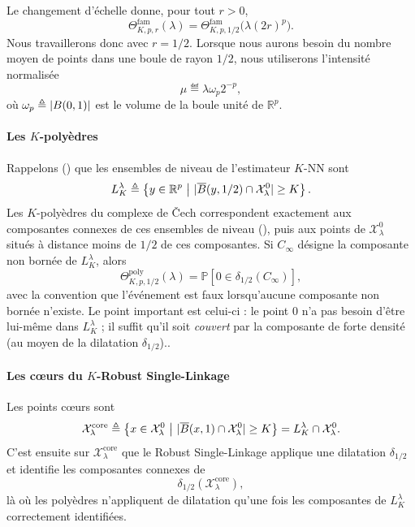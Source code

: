 Le changement d'échelle donne, pour tout $r>0$,
\[
    \Theta^{\mathrm{fam}}_{K,p,r}(\lambda)
    =
    \Theta^{\mathrm{fam}}_{K,p,1/2}\bigl(\lambda(2r)^p\bigr).
\]
Nous travaillerons donc avec $r=1/2$. Lorsque nous aurons besoin du nombre moyen de points dans une boule de rayon $1/2$, nous utiliserons l'intensité normalisée
\[
    \mu \eqdef \lambda \omega_p 2^{-p},
\]
où $\omega_p \triangleq \lvert B(0,1) \rvert$ est le volume de la boule unité de $\mathbb R^p$.

\paragraph{Les $K$-polyèdres}
Rappelons (\Def[def:K-NN]) que les ensembles de niveau de l'estimateur $K$-NN sont
\[
    L^\lambda_K
    \triangleq
    \left\{
        y\in\mathbb R^p
        \ \middle|\
        \lvert \overline B(y,1/2)\cap\mathcal X_\lambda^0 \rvert\ge K
    \right\}.
\]
Les $K$-polyèdres du complexe de \v{C}ech correspondent exactement aux composantes connexes de ces ensembles de niveau (), puis aux points de $\mathcal X_\lambda^0$ situés à distance moins de $1/2$ de ces composantes. Si $C_\infty$ désigne la composante non bornée de $L^\lambda_K$, alors
\[
    \Theta^{\mathrm{poly}}_{K,p,1/2}(\lambda)
    =
    \mathbb P\left[
        0\in\delta_{1/2}(C_\infty)
    \right],
\]
avec la convention que l'événement est faux lorsqu'aucune composante non bornée n'existe. Le point important est celui-ci : le point $0$ n'a pas besoin d'être lui-même dans $L^\lambda_K$ ; il suffit qu'il soit \emph{couvert} par la composante de forte densité (au moyen de la dilatation $\delta_{1/2}$)..

\paragraph{Les cœurs du $K$-Robust Single-Linkage}
Les points cœurs sont
\[
    \mathcal X_\lambda^{\mathrm{core}}
    \triangleq
    \left\{
        x\in\mathcal X_\lambda^0
        \ \middle|\
        \lvert \overline B(x,1)\cap\mathcal X_\lambda^0 \rvert\ge K
    \right\}
    =
    L_K^\lambda\cap\mathcal X_\lambda^0.
\]
C'est ensuite sur $\mathcal X_\lambda^{\mathrm{core}}$ que le Robust Single-Linkage applique une dilatation $\delta_{1/2}$ et identifie les composantes connexes de 
\[
\delta_{1/2}(\mathcal X_\lambda^{\mathrm{core}}),
\] là où les polyèdres n'appliquent de dilatation qu'une fois les composantes de $L_K^\lambda$ correctement identifiées. 


